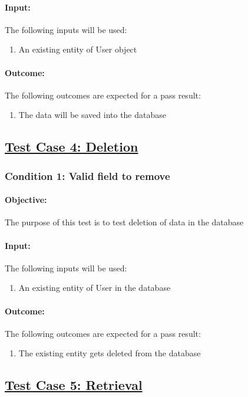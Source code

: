\documentclass{article}
\begin{document}
\paragraph{Input:} The following inputs will be used:
\begin{enumerate}
	\item An existing entity of User object
\end{enumerate}
\paragraph{Outcome:} The following outcomes are expected for a pass result:
\begin{enumerate}
	\item The data will be saved into the database
\end{enumerate}

\subsection{\underline{Test Case 4: Deletion}}\label{test4}
\subsubsection{Condition 1: Valid field to remove }
\paragraph{Objective:} The purpose of this test is to test deletion of data in the database
\paragraph{Input:} The following inputs will be used:
\begin{enumerate}
	\item An existing entity of User in the database
\end{enumerate}
\paragraph{Outcome:} The following outcomes are expected for a pass result:
\begin{enumerate}
	\item The existing entity gets deleted from the database 
\end{enumerate}

\pagebreak

\subsection{\underline{Test Case 5: Retrieval}}\label{test5}
\end{document}
